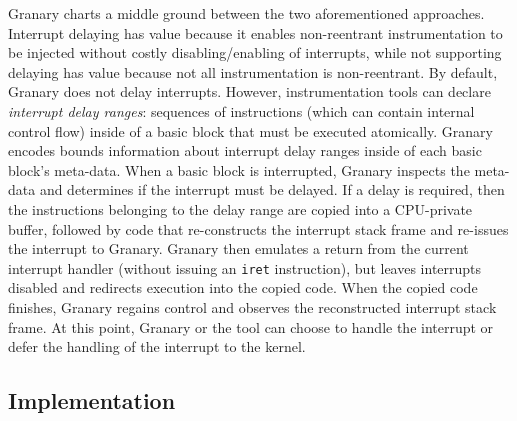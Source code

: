 \documentclass[preprint]{sigplanconf}
\begin{document}
Granary charts a middle ground between the two aforementioned approaches. Interrupt delaying has value because it enables non-reentrant instrumentation to be injected without costly disabling/enabling of interrupts, while not supporting delaying has value because not all instrumentation is non-reentrant. By default, Granary does not delay interrupts. However, instrumentation tools can declare \emph{interrupt delay ranges}: sequences of instructions (which can contain internal control flow) inside of a basic block that must be executed atomically. Granary encodes bounds information about interrupt delay ranges inside of each basic block's meta-data. When a basic block is interrupted, Granary inspects the meta-data and determines if the interrupt must be delayed. If a delay is required, then the instructions belonging to the delay range are copied into a CPU-private buffer, followed by code that re-constructs the interrupt stack frame and re-issues the interrupt to Granary. Granary then emulates a return from the current interrupt handler (without issuing an \texttt{iret} instruction), but leaves interrupts disabled and redirects execution into the copied code. When the copied code finishes, Granary regains control and observes the reconstructed interrupt stack frame. At this point, Granary or the tool can choose to handle the interrupt or defer the handling of the interrupt to the kernel.


\subsection{Implementation}
\end{document}
